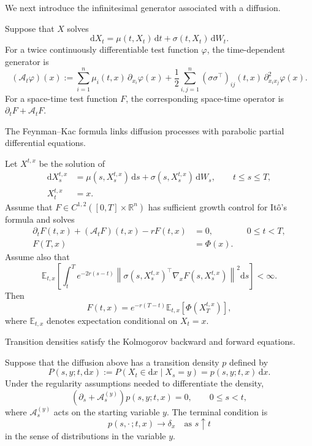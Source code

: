 We next introduce the infinitesimal generator associated with a diffusion.

\begin{de}
Suppose that \(X\) solves
\[
\mathrm dX_t=\mu(t,X_t)\,\mathrm dt+\sigma(t,X_t)\,\mathrm dW_t.
\]
For a twice continuously differentiable test function \(\varphi\), the time-dependent generator is
\[
(\mathcal A_t\varphi)(x)
:=\sum_{i=1}^n\mu_i(t,x)\,\partial_{x_i}\varphi(x)
+\frac12\sum_{i,j=1}^n
(\sigma\sigma^\top)_{ij}(t,x)\,
\partial_{x_ix_j}^2\varphi(x).
\]
For a space-time test function \(F\), the corresponding space-time operator is \(\partial_tF+\mathcal A_tF\).
\end{de}

The Feynman--Kac formula links diffusion processes with parabolic partial differential equations.

\begin{thm}
Let \(X^{t,x}\) be the solution of
\[
\begin{aligned}
\mathrm dX_s^{t,x}
&=\mu(s,X_s^{t,x})\,\mathrm ds
+\sigma(s,X_s^{t,x})\,\mathrm dW_s,
\qquad t\le s\le T,\\
X_t^{t,x}&=x.
\end{aligned}
\]
Assume that \(F\in C^{1,2}([0,T]\times\mathbb R^n)\) has sufficient growth control for It\^o's formula and solves
\[
\begin{aligned}
\partial_tF(t,x)+(\mathcal A_tF)(t,x)-rF(t,x)&=0,
&&0\le t<T,\\
F(T,x)&=\Phi(x).
\end{aligned}
\]
Assume also that
\[
\mathbb E_{t,x}\!\left[
\int_t^T e^{-2r(s-t)}
\left\|
\sigma(s,X_s^{t,x})^\top\nabla_xF(s,X_s^{t,x})
\right\|^2\mathrm ds
\right]<\infty.
\]
Then
\[
F(t,x)
=e^{-r(T-t)}\mathbb E_{t,x}[\Phi(X_T^{t,x})],
\]
where \(\mathbb E_{t,x}\) denotes expectation conditional on \(X_t=x\).
\end{thm}

Transition densities satisfy the Kolmogorov backward and forward equations.

\begin{thm}
Suppose that the diffusion above has a transition density \(p\) defined by
\[
P(s,y;t,\mathrm dx)
:=P(X_t\in\mathrm dx\mid X_s=y)
=p(s,y;t,x)\,\mathrm dx.
\]
Under the regularity assumptions needed to differentiate the density,
\[
\left(\partial_s+\mathcal A_s^{(y)}\right)p(s,y;t,x)=0,
\qquad 0\le s<t,
\]
where \(\mathcal A_s^{(y)}\) acts on the starting variable \(y\). The terminal condition is
\[
p(s,\cdot\,;t,x)\longrightarrow\delta_x
\quad\text{as }s\uparrow t
\]
in the sense of distributions in the variable \(y\).
\end{thm}

